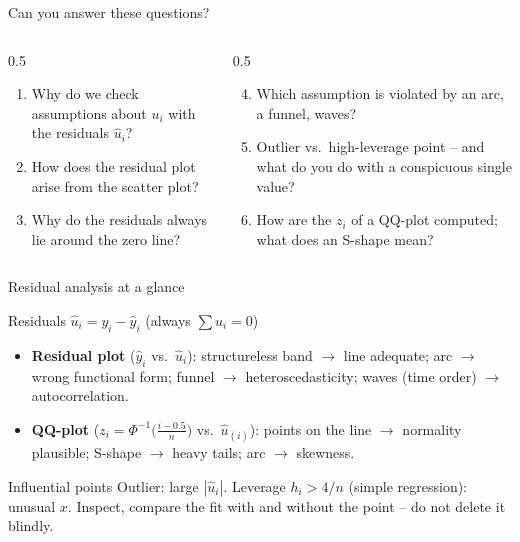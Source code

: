 \documentclass[aspectratio=169,11pt]{beamer}
\begin{document}
\begin{frame}{Can you answer these questions?}
  \small
  \begin{columns}[T]
    \begin{column}{0.5\textwidth}
      \begin{enumerate}
        \setlength{\itemsep}{2pt}
        \item Why do we check assumptions about $u_i$ with the residuals
              $\hat{u}_i$?
        \item How does the residual plot arise from the scatter plot?
        \item Why do the residuals always lie around the zero line?
      \end{enumerate}
    \end{column}
    \begin{column}{0.5\textwidth}
      \begin{enumerate}
        \setcounter{enumi}{3}
        \setlength{\itemsep}{2pt}
        \item Which assumption is violated by an arc, a funnel, waves?
        \item Outlier vs.\ high-leverage point -- and what do you do with a
              conspicuous single value?
        \item How are the $z_i$ of a QQ-plot computed; what does an S-shape
              mean?
      \end{enumerate}
    \end{column}
  \end{columns}

  \medskip
\end{frame}

\begin{frame}{Residual analysis at a glance}
  \begin{block}{Residuals $\hat{u}_i = y_i - \hat{y}_i$ \quad (always $\sum\hat u_i=0$)}
    \begin{itemize}
      \item \textbf{Residual plot} ($\hat y_i$ vs.\ $\hat u_i$): structureless
            band $\to$ line adequate; arc $\to$ wrong functional form; funnel
            $\to$ heteroscedasticity; waves (time order) $\to$ autocorrelation.
      \item \textbf{QQ-plot} ($z_i=\Phi^{-1}\bigl(\frac{i-0.5}{n}\bigr)$ vs.\
            $\hat u_{(i)}$): points on the line $\to$ normality plausible;
            S-shape $\to$ heavy tails; arc $\to$ skewness.
    \end{itemize}
  \end{block}
  \begin{block}{Influential points}
    Outlier: large $|\hat u_i|$. Leverage $h_i>4/n$ (simple regression):
    unusual $x$. Inspect, compare the fit with and without the point -- do not
    delete it blindly.
  \end{block}
\end{frame}
\end{document}
